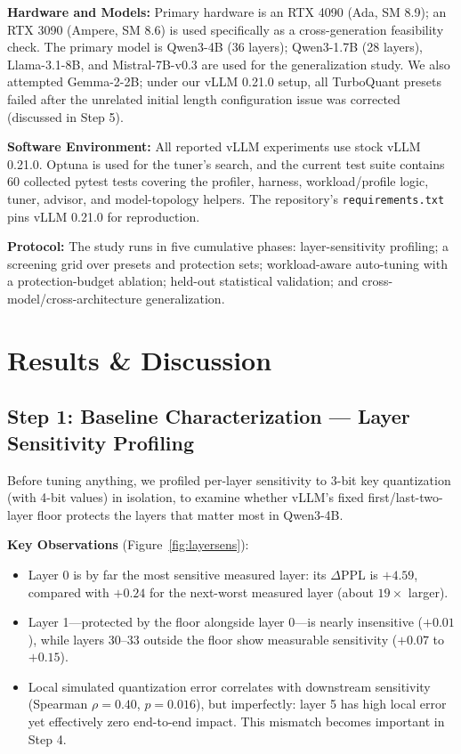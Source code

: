\documentclass[10pt]{article}
\begin{document}
\textbf{Hardware and Models:} Primary hardware is an RTX 4090 (Ada, SM 8.9); an RTX 3090 (Ampere, SM 8.6) is used specifically as a cross-generation feasibility check. The primary model is Qwen3-4B (36 layers); Qwen3-1.7B (28 layers), Llama-3.1-8B, and Mistral-7B-v0.3 are used for the generalization study. We also attempted Gemma-2-2B; under our vLLM 0.21.0 setup, all TurboQuant presets failed after the unrelated initial length configuration issue was corrected (discussed in Step 5).

\textbf{Software Environment:} All reported vLLM experiments use stock vLLM 0.21.0. Optuna is used for the tuner's search, and the current test suite contains 60 collected pytest tests covering the profiler, harness, workload/profile logic, tuner, advisor, and model-topology helpers. The repository's \texttt{requirements.txt} pins vLLM 0.21.0 for reproduction.

\textbf{Protocol:} The study runs in five cumulative phases: layer-sensitivity profiling; a screening grid over presets and protection sets; workload-aware auto-tuning with a protection-budget ablation; held-out statistical validation; and cross-model/cross-architecture generalization.

\section{Results \& Discussion}

\subsection*{Step 1: Baseline Characterization --- Layer Sensitivity Profiling}
Before tuning anything, we profiled per-layer sensitivity to 3-bit key quantization (with 4-bit values) in isolation, to examine whether vLLM's fixed first/last-two-layer floor protects the layers that matter most in Qwen3-4B.

\textbf{Key Observations} (Figure~\ref{fig:layersens}):
\begin{itemize}\itemsep=1pt
\item Layer 0 is by far the most sensitive measured layer: its $\Delta$PPL is $+4.59$, compared with $+0.24$ for the next-worst measured layer (about $19\times$ larger).
\item Layer 1---protected by the floor alongside layer 0---is nearly insensitive ($+0.01$), while layers 30--33 outside the floor show measurable sensitivity ($+0.07$ to $+0.15$).
\item Local simulated quantization error correlates with downstream sensitivity (Spearman $\rho=0.40$, $p=0.016$), but imperfectly: layer 5 has high local error yet effectively zero end-to-end impact. This mismatch becomes important in Step 4.
\end{itemize}
\end{document}
